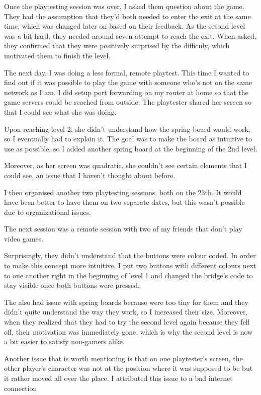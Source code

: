 \documentclass{article}
\begin{document}
Once the playtesting session was over, I asked them question about the game. They had the assumption that they'd both needed to enter the exit at the same time, which was changed later on based on their feedback. As the second level was a bit hard, they needed around seven attempt to reach the exit. When asked, they confirmed that they were positively surprised by the difficuly, which motivated them to finish the level.

\bigskip
The next day, I was doing a less formal, remote playtest. This time I wanted to find out if it was possible to play the game with someone who's not on the same network as I am. I did setup port forwarding on my router at home so that the game servers could be reached from outside. The playtester shared her screen so that I could see what she was doing. 

Upon reaching level 2, she didn't understand how the spring board would work, so I eventually had to explain it. The goal was to make the board as intuitive to use as possible, so I added another spring board at the beginning of the 2nd level. 

Moreover, as her screen was quadratic, she couldn't see certain elements that I could see, an issue that I haven't thought about before.

\bigskip
I then organised another two playtesting sessions, both on the 23th. It would have been better to have them on two separate dates, but this wasn't possible due to organizational issues.

\bigskip
The next session was a remote session with two of my friends that don't play video games.

Surprisingly, they didn't understand that the buttons were colour coded. In order to make this concept more intuitive,  I put two buttons with different colours next to one another right in the beginning of level 1 and changed the bridge's code to stay visible once both buttons were pressed.

The also had issue with spring boards because were too tiny for them and they didn't quite understand the way they work, so I increased their size.
Moreover, when they realized that they had to try the second level again because they fell off, their motivation was immediately gone, which is why the second level is now a bit easier to satisfy non-gamers alike.

Another issue that is worth mentioning is that on one playtester's screen, the other player's character was not at the position where it was supposed to be but it rather moved all over the place. I attributed this issue to a bad internet connection
\end{document}
